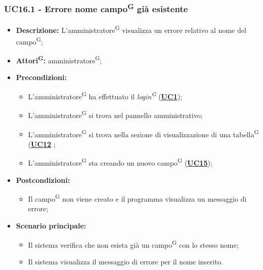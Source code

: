 \subsubsection{UC16.1 - Errore nome campo\textsuperscript{G} già esistente}
\label{sec:UC16.1}
\begin{itemize}
	\item \textbf{Descrizione:} L’amministratore\textsuperscript{G} visualizza un errore relativo al nome del campo\textsuperscript{G};
	\item \textbf{Attori\textsuperscript{G}:} amministratore\textsuperscript{G};
	\item \textbf{Precondizioni:} 
	\begin{itemize}
		\item L’amministratore\textsuperscript{G} ha effettuato il \textit{login\textsuperscript{G}} (\hyperref[sec:UC1]{\textbf{UC1}});
		\item L’amministratore\textsuperscript{G} si trova nel pannello amministrativo;
		\item L’amministratore\textsuperscript{G} si trova nella sezione di visualizzazione di una tabella\textsuperscript{G} (\hyperref[sec:UC12]{\textbf{UC12}} ;
		\item L’amministratore\textsuperscript{G} sta creando un nuovo campo\textsuperscript{G} (\hyperref[sec:UC15]{\textbf{UC15}});
	\end{itemize}
	\item \textbf{Postcondizioni:} 
	\begin{itemize}
		\item Il campo\textsuperscript{G} non viene creato e il programma visualizza un messaggio di errore;
	\end{itemize}
	\item \textbf{Scenario principale:} 
	\begin{itemize}
		\item Il sistema verifica che non esista già un campo\textsuperscript{G} con lo stesso nome;
		\item Il sistema visualizza il messaggio di errore per il nome inserito.
	\end{itemize}
\end{itemize}

